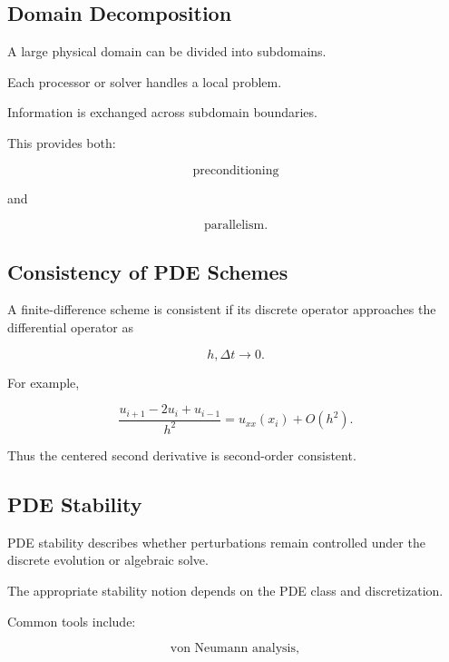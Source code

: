 \subsection{Domain Decomposition}
\label{subsec:domain-decomposition}

A large physical domain can be divided into subdomains.

Each processor or solver handles a local problem.

Information is exchanged across subdomain boundaries.

This provides both:

\[
\boxed{
\text{preconditioning}
}
\]

and

\[
\boxed{
\text{parallelism}.
}
\]

\subsection{Consistency of PDE Schemes}
\label{subsec:pde-consistency}

A finite-difference scheme is consistent if its discrete operator
approaches the differential operator as

\[
h,\Delta t\to0.
\]

For example,

\[
\boxed{
\frac{
u_{i+1}-2u_i+u_{i-1}
}{
h^2
}
=
u_{xx}(x_i)
+
O(h^2).
}
\]

Thus the centered second derivative is second-order consistent.

\subsection{PDE Stability}
\label{subsec:pde-stability}

PDE stability describes whether perturbations remain controlled under the
discrete evolution or algebraic solve.

The appropriate stability notion depends on the PDE class and
discretization.

Common tools include:

\[
\boxed{
\text{von Neumann analysis},
}
\]

